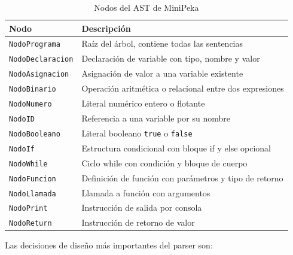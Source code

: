 \documentclass[12pt]{article}
\begin{document}
\begin{table}[H]
\centering
\small
\renewcommand{\arraystretch}{1.1}
\begin{tabular}{@{}p{3.5cm} p{9.0cm}@{}}
\toprule
\textbf{Nodo} & \textbf{Descripción} \\
\midrule
\texttt{NodoPrograma}    & Raíz del árbol, contiene todas las sentencias \\
\texttt{NodoDeclaracion} & Declaración de variable con tipo, nombre y valor \\
\texttt{NodoAsignacion}  & Asignación de valor a una variable existente \\
\texttt{NodoBinario}     & Operación aritmética o relacional entre dos expresiones \\
\texttt{NodoNumero}      & Literal numérico entero o flotante \\
\texttt{NodoID}          & Referencia a una variable por su nombre \\
\texttt{NodoBooleano}    & Literal booleano \texttt{true} o \texttt{false} \\
\texttt{NodoIf}          & Estructura condicional con bloque if y else opcional \\
\texttt{NodoWhile}       & Ciclo while con condición y bloque de cuerpo \\
\texttt{NodoFuncion}     & Definición de función con parámetros y tipo de retorno \\
\texttt{NodoLlamada}     & Llamada a función con argumentos \\
\texttt{NodoPrint}       & Instrucción de salida por consola \\
\texttt{NodoReturn}      & Instrucción de retorno de valor \\
\bottomrule
\end{tabular}
\caption{Nodos del AST de MiniPeka}
\end{table}

\noindent
Las decisiones de diseño más importantes del parser son:
\end{document}
